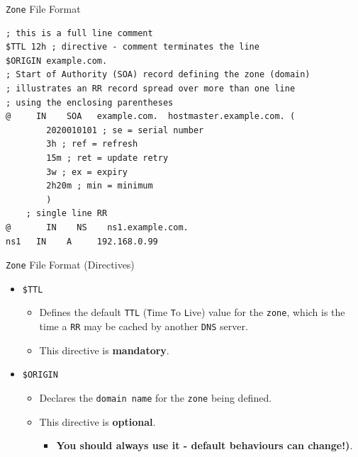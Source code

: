 \documentclass[xcolor=table]{beamer}
\begin{document}
\begin{frame}[fragile]{\texttt{Zone} File Format}
  \lstset{
    basicstyle=\scriptsize\ttfamily,
  }
  \begin{lstlisting}
; this is a full line comment
$TTL 12h ; directive - comment terminates the line
$ORIGIN example.com.
; Start of Authority (SOA) record defining the zone (domain)
; illustrates an RR record spread over more than one line
; using the enclosing parentheses
@     IN    SOA   example.com.  hostmaster.example.com. (
        2020010101 ; se = serial number
        3h ; ref = refresh
        15m ; ret = update retry
        3w ; ex = expiry
        2h20m ; min = minimum
        )
    ; single line RR
@	    IN    NS    ns1.example.com.
ns1   IN    A     192.168.0.99
  \end{lstlisting}
\end{frame}

\begin{frame}{\texttt{Zone} File Format (Directives)}
  \begin{itemize}
    \item \texttt{\$TTL}
      \begin{itemize}
        \item Defines the default \texttt{TTL} (\texttt{T}ime \texttt{T}o \texttt{L}ive) value for the \texttt{zone}, which is the time a \texttt{RR} may be cached by another \texttt{DNS} server.
        \item This directive is \textbf{mandatory}.
      \end{itemize}
      \item \texttt{\$ORIGIN}
      \begin{itemize}
        \item Declares the \texttt{domain name} for the \texttt{zone} being defined.
        \item This directive is \textbf{optional}.
        \begin{itemize} 
          \item \textbf{You should always use it - default behaviours can change!)}.
        \end{itemize}
      \end{itemize}
  \end{itemize}
\end{frame}
\end{document}
